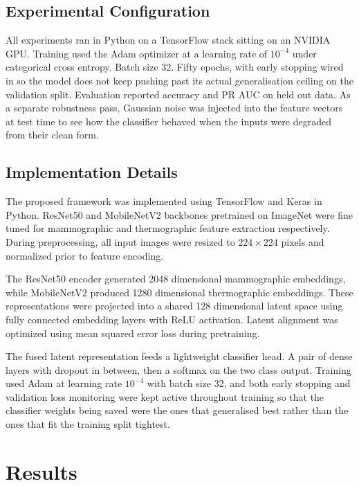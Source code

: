 \documentclass[lettersize,journal]{IEEEtran}
\begin{document}
\subsection{Experimental Configuration}

All experiments ran in Python on a TensorFlow stack sitting on an NVIDIA GPU. Training used the Adam optimizer at a learning rate of $10^{-4}$ under categorical cross entropy. Batch size 32. Fifty epochs, with early stopping wired in so the model does not keep pushing past its actual generalisation ceiling on the validation split. Evaluation reported accuracy and PR AUC on held out data. As a separate robustness pass, Gaussian noise was injected into the feature vectors at test time to see how the classifier behaved when the inputs were degraded from their clean form.

\subsection{Implementation Details}

The proposed framework was implemented using TensorFlow and Keras in Python. ResNet50 and MobileNetV2 backbones pretrained on ImageNet were fine tuned for mammographic and thermographic feature extraction respectively. During preprocessing, all input images were resized to $224 \times 224$ pixels and normalized prior to feature encoding.

The ResNet50 encoder generated 2048 dimensional mammographic embeddings, while MobileNetV2 produced 1280 dimensional thermographic embeddings. These representations were projected into a shared 128 dimensional latent space using fully connected embedding layers with ReLU activation. Latent alignment was optimized using mean squared error loss during pretraining.

The fused latent representation feeds a lightweight classifier head. A pair of dense layers with dropout in between, then a softmax on the two class output. Training used Adam at learning rate $10^{-4}$ with batch size 32, and both early stopping and validation loss monitoring were kept active throughout training so that the classifier weights being saved were the ones that generalised best rather than the ones that fit the training split tightest.

\section{Results}
\end{document}
